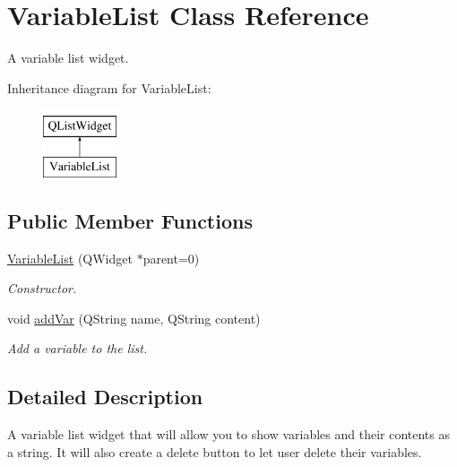 \hypertarget{classVariableList}{\section{Variable\+List Class Reference}
\label{classVariableList}
}


A variable list widget.  


Inheritance diagram for Variable\+List\+:\begin{figure}[H]
\begin{center}
\leavevmode
\includegraphics[height=2.000000cm]{classVariableList}
\end{center}
\end{figure}
\subsection*{Public Member Functions}
\begin{DoxyCompactItemize}
\item 
\hyperlink{classVariableList_ad8d6c0f46b8a064c30f42bdd42bb35b1}{Variable\+List} (Q\+Widget $\ast$parent=0)
\begin{DoxyCompactList}\small\item\em Constructor. \end{DoxyCompactList}\item 
void \hyperlink{classVariableList_a69e0e071a2dedf2f0af1225889a281f1}{add\+Var} (Q\+String name, Q\+String content)
\begin{DoxyCompactList}\small\item\em Add a variable to the list. \end{DoxyCompactList}\end{DoxyCompactItemize}


\subsection{Detailed Description}
A variable list widget that will allow you to show variables and their contents as a string. It will also create a delete button to let user delete their variables. 

